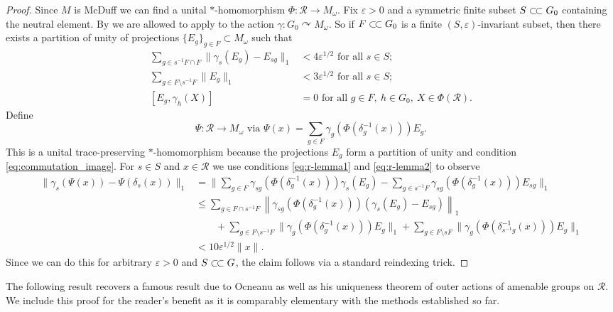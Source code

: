 \documentclass[11pt,a4paper]{article}
\theoremstyle{definition}
\theoremstyle{remark}
\numberwithin{equation}{section}
\numberwithin{theorem}{section}
\newcommand{\e}{\varepsilon}
\newcommand{\ssubset}{\subset\joinrel\subset}
\begin{document}
\begin{proof}
Since $M$ is McDuff we can find a unital $*$-homomorphism $\Phi: \mathcal{R} \rightarrow M_\omega$. Fix $\e >0$ and a symmetric finite subset $S \ssubset G_0$ containing the neutral element.
By \cite[Lemmas 5.6 and 5.7]{Ocneanu85} we are allowed to apply \cite[Theorem 4.8]{Masuda13} to the action $\gamma\colon G_0\curvearrowright M_\omega$.
So if $F \ssubset G_0$ is a finite $(S,\e)$-invariant subset, then there exists a partition of unity of projections $\{E_g\}_{g \in F} \subset M_\omega$ such that
\begin{align}
\sum_{g \in s^{-1}F \cap F} \|\gamma_{s}(E_g) - E_{sg}\|_1 &< 4\e^{1/2} \text{ for all } s \in S; \label{eq:r-lemma1}\\
\sum_{g \in F\setminus s^{-1}F} \|E_g\|_1 &< 3\e^{1/2} \text{ for all } s \in S;\label{eq:r-lemma2}\\
[E_g, \gamma_h(X)] &= 0 \text{ for all } g \in F,\ h\in G_0,\ X \in \Phi(\mathcal{R}).\label{eq:commutation_image}
\end{align}
Define 
\[
\Psi: \mathcal{R} \rightarrow M_\omega \text{ via } \Psi(x) = \sum_{g\in F} \gamma_{g}(\Phi(\delta_{g}^{-1}(x))) E_g.
\]
This is a unital trace-preserving $*$-homomorphism because the projections $E_g$ form a partition of unity and condition \eqref{eq:commutation_image}.
For $s \in S$ and $x \in \mathcal{R}$ we use conditions \eqref{eq:r-lemma1} and \eqref{eq:r-lemma2} to observe
\begin{align*}
\|\gamma_{s}(\Psi(x)) - \Psi(\delta_s(x))\|_1 &=  \Big\| \sum_{g \in F} \gamma_{sg}(\Phi(\delta_g^{-1}(x))) \gamma_{s}(E_g) - \sum_{g \in s^{-1}F} \gamma_{sg}(\Phi(\delta_{g}^{-1}(x))) E_{sg} \Big\|_1
\\
&\leq \sum_{g \in F \cap s^{-1}F}  \left\| \gamma_{sg}(\Phi(\delta_g^{-1}(x))) ( \gamma_{s}(E_g) - E_{sg}) \right\|_1\\
& \qquad + \sum_{g \in F\setminus s^{-1}F} \|\gamma_g(\Phi(\delta_g^{-1}(x))) E_g\|_1 + \sum_{g \in F \setminus sF} \|\gamma_{g}(\Phi(\delta_{s^{-1}g}^{-1}(x)))E_g\|_1 \\
&< 10\e^{1/2}\|x\|.
\end{align*}
Since we can do this for arbitrary $\e >0$ and $S \ssubset G$, the claim follows via a standard reindexing trick.
\end{proof}

The following result recovers a famous result due to Ocneanu \cite[Theorem 1.2 and following remark]{Ocneanu85} as well as his uniqueness theorem of outer actions of amenable groups on $\mathcal R$.
We include this proof for the reader's benefit as it is comparably elementary with the methods established so far.
\end{document}
